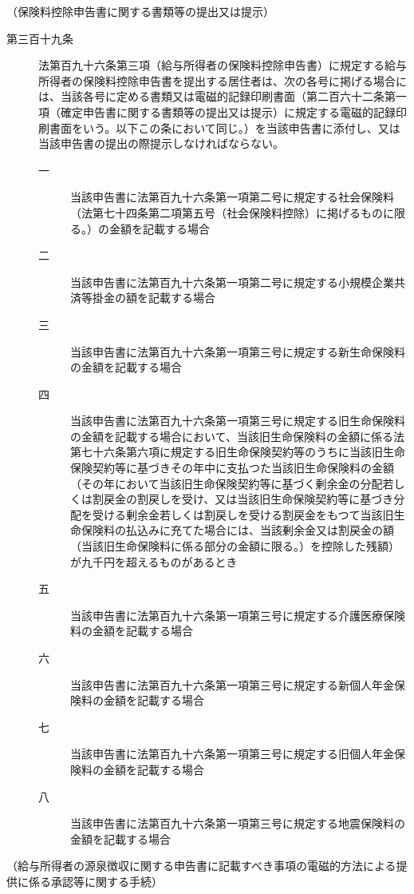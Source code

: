 \documentclass[twocolumn,a4j,10pt]{ltjtarticle}
\begin{document}
\noindent\hspace{10pt}（保険料控除申告書に関する書類等の提出又は提示）
\begin{description}
\item[第三百十九条]法第百九十六条第三項（給与所得者の保険料控除申告書）に規定する給与所得者の保険料控除申告書を提出する居住者は、次の各号に掲げる場合には、当該各号に定める書類又は電磁的記録印刷書面（第二百六十二条第一項（確定申告書に関する書類等の提出又は提示）に規定する電磁的記録印刷書面をいう。以下この条において同じ。）を当該申告書に添付し、又は当該申告書の提出の際提示しなければならない。
\begin{description}
\item[一]当該申告書に法第百九十六条第一項第二号に規定する社会保険料（法第七十四条第二項第五号（社会保険料控除）に掲げるものに限る。）の金額を記載する場合
\item[二]当該申告書に法第百九十六条第一項第二号に規定する小規模企業共済等掛金の額を記載する場合
\item[三]当該申告書に法第百九十六条第一項第三号に規定する新生命保険料の金額を記載する場合
\item[四]当該申告書に法第百九十六条第一項第三号に規定する旧生命保険料の金額を記載する場合において、当該旧生命保険料の金額に係る法第七十六条第六項に規定する旧生命保険契約等のうちに当該旧生命保険契約等に基づきその年中に支払つた当該旧生命保険料の金額（その年において当該旧生命保険契約等に基づく剰余金の分配若しくは割戻金の割戻しを受け、又は当該旧生命保険契約等に基づき分配を受ける剰余金若しくは割戻しを受ける割戻金をもつて当該旧生命保険料の払込みに充てた場合には、当該剰余金又は割戻金の額（当該旧生命保険料に係る部分の金額に限る。）を控除した残額）が九千円を超えるものがあるとき
\item[五]当該申告書に法第百九十六条第一項第三号に規定する介護医療保険料の金額を記載する場合
\item[六]当該申告書に法第百九十六条第一項第三号に規定する新個人年金保険料の金額を記載する場合
\item[七]当該申告書に法第百九十六条第一項第三号に規定する旧個人年金保険料の金額を記載する場合
\item[八]当該申告書に法第百九十六条第一項第三号に規定する地震保険料の金額を記載する場合
\end{description}
\end{description}
\noindent\hspace{10pt}（給与所得者の源泉徴収に関する申告書に記載すべき事項の電磁的方法による提供に係る承認等に関する手続）
\end{document}
